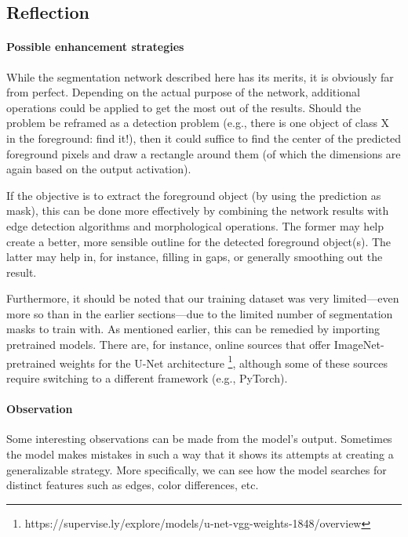 
\subsection{Reflection}

\paragraph{Possible enhancement strategies} While the segmentation network described here has its merits, it is obviously far from perfect. Depending on the actual purpose of the network, additional operations could be applied to get the most out of the results. Should the problem be reframed as a detection problem (e.g., there is one object of class X in the foreground: find it!), then it could suffice to find the center of the predicted foreground pixels and draw a rectangle around them (of which the dimensions are again based on the output activation).

If the objective is to extract the foreground object (by using the prediction as mask), this can be done more effectively by combining the network results with edge detection algorithms and morphological operations. The former may help create a better, more sensible outline for the detected foreground object(s). The latter may help in, for instance, filling in gaps, or generally smoothing out the result.

Furthermore, it should be noted that our training dataset was very limited---even more so than in the earlier sections---due to the limited number of segmentation masks to train with. As mentioned earlier, this can be remedied by importing pretrained models. There are, for instance, online sources that offer ImageNet-pretrained weights for the U-Net architecture \footnote{https://supervise.ly/explore/models/u-net-vgg-weights-1848/overview}, although some of these sources require switching to a different framework (e.g., PyTorch).

\paragraph{Observation} Some interesting observations can be made from the model's output. Sometimes the model makes mistakes in such a way that it shows its attempts at creating a generalizable strategy. More specifically, we can see how the model searches for distinct features such as edges, color differences, etc.

